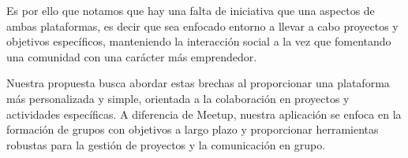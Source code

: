 Es por ello que notamos que hay una falta de iniciativa que una aspectos de ambas plataformas, es decir que sea enfocado entorno a llevar a cabo proyectos y objetivos específicos, manteniendo la interacción social a la vez que fomentando una comunidad con una carácter más emprendedor.

Nuestra propuesta busca abordar estas brechas al proporcionar una 
plataforma más personalizada y simple, orientada a la colaboración en proyectos y 
actividades específicas. A diferencia de Meetup, nuestra aplicación se 
enfoca en la formación de grupos con objetivos a largo plazo y proporcionar
herramientas robustas para la gestión de proyectos y la comunicación en grupo.